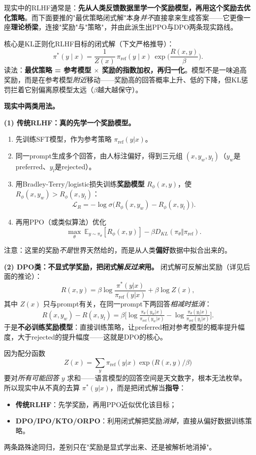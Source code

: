 \documentclass[11pt,a4paper]{article}
\theoremstyle{definition}
\begin{document}
现实中的RLHF通常是：\textbf{先从人类反馈数据里学一个奖励模型，再用这个奖励去优化策略}。而下面要推的"最优策略闭式解"本身\emph{并不}直接拿来生成答案——它更像一座\textbf{理论桥梁}，连接"奖励"与"策略"，并由此派生出PPO与DPO两条现实路线。

核心是KL正则化RLHF目标的闭式解（下文严格推导）：
\[
\pi^*(y\mid x)=\frac{1}{Z(x)}\,\pi_{\text{ref}}(y\mid x)\,\exp\!\Big(\frac{R(x,y)}{\beta}\Big).
\]
读法：\textbf{最优策略 = 参考模型 $\times$ 奖励的指数加权，再归一化}。模型不是一味追高奖励，而是在参考模型\emph{附近}移动——奖励高的回答概率上升、低的下降，但KL惩罚拦着它别偏离原模型太远（$\beta$越大越保守）。

\textbf{现实中两类用法。}

\textbf{(1) 传统RLHF：真的先学一个奖励模型。}
\begin{enumerate}
\item 先训练SFT模型，作为参考策略 $\pi_{\text{ref}}(y|x)$。
\item 同一prompt生成多个回答，由人标注偏好，得到三元组 $(x,y_w,y_l)$（$y_w$是preferred、$y_l$是rejected）。
\item 用Bradley-Terry/logistic损失训练\textbf{奖励模型} $R_\phi(x,y)$，使 $R_\phi(x,y_w)>R_\phi(x,y_l)$：
\[
\mathcal{L}_R=-\log\sigma\big(R_\phi(x,y_w)-R_\phi(x,y_l)\big).
\]
\item 再用PPO（或类似算法）优化
\[
\max_\theta\ \mathbb{E}_{y\sim\pi_\theta}[R_\phi(x,y)]-\beta D_{KL}(\pi_\theta\Vert\pi_{\text{ref}}).
\]
\end{enumerate}
注意：这里的奖励\emph{不是}世界天然给的，而是从人类\textbf{偏好}数据中拟合出来的。

\textbf{(2) DPO类：不显式学奖励，把闭式解\emph{反过来}用。}
闭式解可反解出奖励（详见后面的推论）：
\[
R(x,y)=\beta\log\frac{\pi^*(y|x)}{\pi_{\text{ref}}(y|x)}+\beta\log Z(x),
\]
其中 $Z(x)$ 只与prompt有关，在同一prompt下两回答\emph{相减时抵消}：
\[
R(x,y_w)-R(x,y_l)=\beta\Big[\log\tfrac{\pi_\theta(y_w|x)}{\pi_{\text{ref}}(y_w|x)}-\log\tfrac{\pi_\theta(y_l|x)}{\pi_{\text{ref}}(y_l|x)}\Big].
\]
于是\textbf{不必训练奖励模型}：直接训练策略，让preferred相对参考模型的概率提升幅度，大于rejected的提升幅度——这就是DPO的核心。

\begin{keypoint}[为什么不直接用闭式解生成？]
因为配分函数
\[
Z(x)=\sum_y \pi_{\text{ref}}(y|x)\exp\big(R(x,y)/\beta\big)
\]
要对\emph{所有可能回答} $y$ 求和——语言模型的回答空间是天文数字，根本无法枚举。所以现实中从不真的去算 $\pi^*(y|x)$，而是把闭式解当\textbf{指导}：
\begin{itemize}
\item \textbf{传统RLHF}：先学奖励，再用PPO近似优化该目标；
\item \textbf{DPO/IPO/KTO/ORPO}：利用闭式解把奖励\emph{消掉}，直接从偏好数据训练策略。
\end{itemize}
两条路殊途同归，差别只在"奖励是显式学出来、还是被解析地消掉"。
\end{keypoint}
\end{document}
